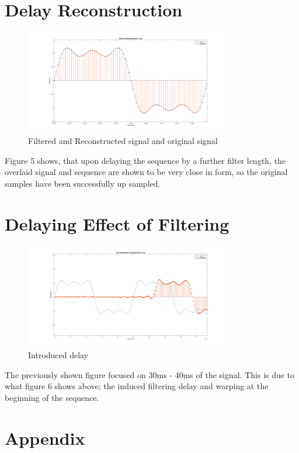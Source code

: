 \documentclass[11pt]{article}
\begin{document}
\section{Delay Reconstruction}

\begin{figure}[!h]
	\centering
	\includegraphics[width=0.8\textwidth]{fig5}
	\caption{Filtered and Reconstructed signal and original signal}
\end{figure}

Figure 5 shows, that upon delaying the sequence by a further filter length, the overlaid signal and sequence are shown to be very close in form, so the original samples have been successfully up sampled.

\newpage
\section{Delaying Effect of Filtering}
\begin{figure}[!h]
	\centering
	\includegraphics[width=0.8\textwidth]{fig6}
	\caption{Introduced delay}
\end{figure}

The previously shown figure focused on 30ms - 40ms of the signal. This is due to what figure 6 shows above; the induced filtering delay and warping at the beginning of the sequence.
\newpage
\section*{Appendix}

\end{document}
